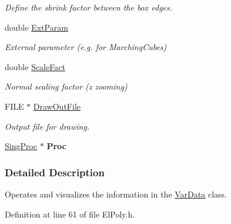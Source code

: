 \begin{DoxyCompactItemize}
\begin{DoxyCompactList}\small\item\em \-Define the shrink factor between the box edges. \end{DoxyCompactList}\item 
\hypertarget{classElPoly_a669c83da48812050d13a2c63fff0fef9}{double \hyperlink{classElPoly_a669c83da48812050d13a2c63fff0fef9}{\-Ext\-Param}}\label{classElPoly_a669c83da48812050d13a2c63fff0fef9}

\begin{DoxyCompactList}\small\item\em \-External parameter (e.\-g. for \-Marching\-Cubes) \end{DoxyCompactList}\item 
\hypertarget{classElPoly_ae8a6916dd0cb066c7e911f973caf504a}{double \hyperlink{classElPoly_ae8a6916dd0cb066c7e911f973caf504a}{\-Scale\-Fact}}\label{classElPoly_ae8a6916dd0cb066c7e911f973caf504a}

\begin{DoxyCompactList}\small\item\em \-Normal scaling factor (z zooming) \end{DoxyCompactList}\item 
\hypertarget{classElPoly_a034d945a96ab42d2a57ac4e12c8aab9e}{\-F\-I\-L\-E $\ast$ \hyperlink{classElPoly_a034d945a96ab42d2a57ac4e12c8aab9e}{\-Draw\-Out\-File}}\label{classElPoly_a034d945a96ab42d2a57ac4e12c8aab9e}

\begin{DoxyCompactList}\small\item\em \-Output file for drawing. \end{DoxyCompactList}\item 
\hypertarget{classElPoly_adde8a4e5814f247c722934064b0f68b9}{\hyperlink{classSingProc}{\-Sing\-Proc} $\ast$ {\bfseries \-Proc}}\label{classElPoly_adde8a4e5814f247c722934064b0f68b9}

\end{DoxyCompactItemize}


\subsubsection{\-Detailed \-Description}
\-Operates and visualizes the information in the \hyperlink{classVarData}{\-Var\-Data} class. 

\-Definition at line 61 of file \-El\-Poly.\-h.




